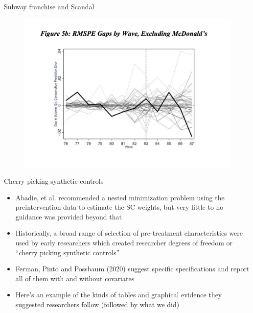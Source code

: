 \documentclass{beamer}
\begin{document}
\begin{frame}{Subway franchise and Scandal}

	\begin{figure}
	\includegraphics[scale=0.35]{./lecture_includes/subway_6.png}
	\end{figure}

\end{frame}

\begin{frame}{Cherry picking synthetic controls}

\begin{itemize}
\item Abadie, et al. recommended a nested minimization problem using the preintervention data to estimate the SC weights, but very little to no guidance was provided beyond that
\item Historically, a broad range of selection of pre-treatment characteristics were used by early researchers which created researcher degrees of freedom or ``cherry picking synthetic controls''
\item Ferman, Pinto and Possbaum (2020) suggest specific specifications and report all of them with and without covariates
\item Here's an example of the kinds of tables and graphical evidence they suggested researchers follow (followed by what we did)
\end{itemize}

\end{frame}
\end{document}
